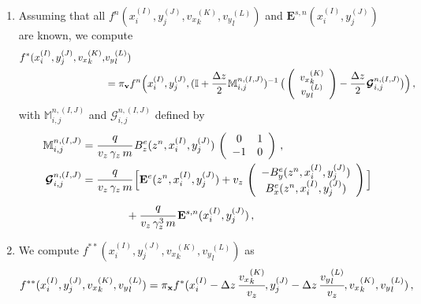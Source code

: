 \documentclass[10pt]{article}
\begin{document}
\begin{enumerate}
\item Assuming that all $f^{n}(x_{i}^{(I)},y_{j}^{(J)},{v_{x}}_{k}^{(K)},{v_{y}}_{l}^{(L)})$ and $\mathbf{E}^{s,n}(x_{i}^{(I)},y_{j}^{(J)})$ are known, we compute
\begin{equation}
\begin{split}
f^{*}(x_{i}^{(I)},y_{j}^{(J)},{v_{x}}_{k}^{(K)},&{v_{y}}_{l}^{(L)}) \\
&= \pi_{\mathbf{v}}f^{n}\Big(x_{i}^{(I)},y_{j}^{(J)},(\mathbb{I}+\cfrac{\Delta z}{2}\,\mathbb{M}_{i,j}^{n,(I,J)})^{-1}\,\big( \left(
\begin{array}{c}
{v_{x}}_{k}^{(K)} \\ {v_{y}}_{l}^{(L)}
\end{array}
\right) - \cfrac{\Delta z}{2}\, \bm{\mathcal{G}}_{i,j}^{n,(I,J)}\big) \Big) \, ,
\end{split}
\end{equation}
with $\mathbb{M}_{i,j}^{n,(I,J)}$ and $\bm{\mathcal{G}}_{i,j}^{n,(I,J)}$ defined by
\begin{equation}
\begin{split}
\mathbb{M}_{i,j}^{n,(I,J)} &= \cfrac{q}{v_{z}\,\gamma_{z}\,m} \, B_{z}^{e}(z^{n},x_{i}^{(I)},y_{j}^{(J)})\, \left(
\begin{array}{cc}
0 & 1 \\ -1 & 0
\end{array}
\right) \, , \\
\bm{\mathcal{G}}_{i,j}^{n,(I,J)} &= \cfrac{q}{v_{z}\,\gamma_{z}\,m}\,\Big[ \mathbf{E}^{e}(z^{n},x_{i}^{(I)},y_{j}^{(J)}) + v_{z}\,\left(
\begin{array}{c}
-B_{y}^{e}(z^{n},x_{i}^{(I)},y_{j}^{(J)}) \\ B_{x}^{e}(z^{n},x_{i}^{(I)},y_{j}^{(J)})
\end{array}
\right) \Big] \\
&\qquad \qquad + \cfrac{q}{v_{z}\,\gamma_{z}^{3}\,m} \, \mathbf{E}^{s,n}(x_{i}^{(I)},y_{j}^{(J)}) \, ,
\end{split}
\end{equation}

\item We compute $f^{**}(x_{i}^{(I)},y_{j}^{(J)},{v_{x}}_{k}^{(K)},{v_{y}}_{l}^{(L)})$ as
\begin{equation}
f^{**}(x_{i}^{(I)},y_{j}^{(J)},{v_{x}}_{k}^{(K)},{v_{y}}_{l}^{(L)}) = \pi_{\mathbf{x}}f^{*}(x_{i}^{(I)}-\Delta z \, \cfrac{{v_{x}}_{k}^{(K)}}{v_{z}}, y_{j}^{(J)}-\Delta z \, \cfrac{{v_{y}}_{l}^{(L)}}{v_{z}}, {v_{x}}_{k}^{(K)},{v_{y}}_{l}^{(L)}) \, ,
\end{equation}



\end{enumerate}
\end{document}

